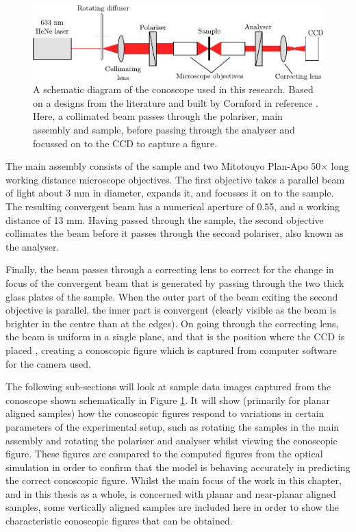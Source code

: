 \begin{figure}
\begin{center}
\includegraphics[width=\textwidth]{Figures/conoscopy/conoscope_setup}
\end{center}
\caption[Schematic diagram of the conoscope setup]{\label{fig:conoscope_schem}A schematic diagram of the conoscope used in this research. Based on a designs from the literature \cite{Parry-Jones2002,Fujikawa1993} and built by Cornford in reference \cite{Cornford2008}. Here, a collimated beam passes through the polariser, main assembly and sample, before passing through the analyser and focussed on to the CCD to capture a figure.}
\end{figure}

The main assembly consists of the sample and two Mitotouyo Plan-Apo 50$\times$ long working distance microscope objectives. The first objective takes a parallel beam of light about 3 mm in diameter, expands it, and focusses it on to the sample. The resulting convergent beam has a numerical aperture of 0.55, and a working distance of 13 mm. Having passed through the sample, the second objective collimates the beam before it passes through the second polariser, also known as the analyser.

Finally, the beam passes through a correcting lens to correct for the change in focus of the convergent beam that is generated by passing through the two thick glass plates of the sample. When the outer part of the beam exiting the second objective is parallel, the inner part is convergent (clearly visible as the beam is brighter in the centre than at the edges). On going through the correcting lens, the beam is uniform in a single plane, and that is the position where the CCD is placed \cite{Cornford2008}, creating a conoscopic figure which is captured from computer software for the camera used.

The following sub-sections will look at sample data images captured from the conoscope shown schematically in Figure \ref{fig:conoscope_schem}. It will show (primarily for planar aligned samples) how the conoscopic figures respond to variations in certain parameters of the experimental setup, such as rotating the samples in the main assembly and rotating the polariser and analyser whilst viewing the conoscopic figure. These figures are compared to the computed figures from the optical simulation in order to confirm that the model is behaving accurately in predicting the correct conoscopic figure. Whilst the main focus of the work in this chapter, and in this thesis as a whole, is concerned with planar and near-planar aligned samples, some vertically aligned samples are included here in order to show the characteristic conoscopic figures that can be obtained.

